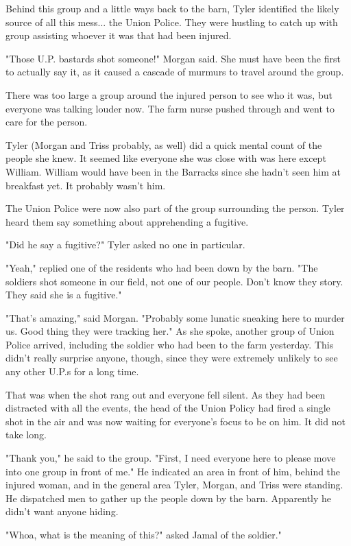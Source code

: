 \documentclass[courier]{sffms}
\begin{document}
Behind this group and a little ways back to
the barn, Tyler identified the likely source
of all this mess... the Union Police. They
were hustling to catch up with group assisting
whoever it was that had been injured.

"Those U.P. bastards shot someone!" Morgan
said. She must have been the first to actually
say it, as it caused a cascade of murmurs to
travel around the group.

There was too large a group around the injured
person to see who it was, but everyone was
talking louder now. The farm nurse pushed
through and went to care for the person.

Tyler (Morgan and Triss probably, as well) did
a quick mental count of the people she knew.
It seemed like everyone she was close with 
was here except William. William would have
been in the Barracks since she hadn't seen him
at breakfast yet. It probably wasn't him.

The Union Police were now also part of the
group surrounding the person. Tyler
heard them say something about apprehending
a fugitive.

"Did he say a fugitive?" Tyler asked no one in
particular. 

"Yeah," replied one of the residents who had
been down by the barn. "The soldiers shot someone
in our field, not one of our people. Don't know
they story. They said she is a fugitive."

"That's amazing," said Morgan. "Probably some
lunatic sneaking here to murder us. Good thing
they were tracking her." As she spoke, another
group of Union Police arrived, including the
soldier who had been to the farm yesterday. This
didn't really surprise anyone, though, since they
were extremely unlikely to see any other U.P.s
for a long time.

That was when the shot rang out and everyone
fell silent. As they had been distracted with all the
events, the head of the Union Policy had fired
a single shot in the air and was now waiting for
everyone's focus to be on him. It did not take
long.

"Thank you," he said to the group. "First, I need
everyone here to please move into one group in
front of me." He indicated an area in front of him,
behind the injured woman, and in the general area
Tyler, Morgan, and Triss were standing. He
dispatched men to gather up the people down
by the barn. Apparently he didn't want anyone
hiding.

"Whoa, what is the meaning of this?" asked Jamal
of the soldier."
\end{document}

